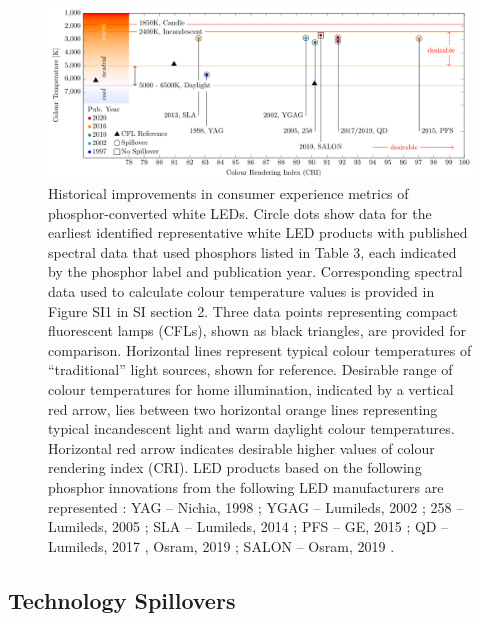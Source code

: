 \documentclass[twoside,twocolumn,9pt]{article}
\begin{document}
\begin{figure}[h]
 \centering
 \includegraphics[width=\textwidth]{2_SSL_EES/article/figures/breakthroughs_consumer-experience.pdf}
 \caption{Historical improvements in consumer experience metrics of phosphor-converted white LEDs. Circle dots show data for the earliest identified representative white LED products with published spectral data that used phosphors listed in Table 3, each indicated by the phosphor label and publication year. Corresponding spectral data used to calculate colour temperature values is provided in Figure SI1 in SI section 2. Three data points representing compact fluorescent lamps (CFLs)\cite{cie_reference}, shown as black triangles, are provided for comparison. Horizontal lines represent typical colour temperatures of “traditional” light sources, shown for reference. Desirable range of colour temperatures for home illumination, indicated by a vertical red arrow, lies between two horizontal orange lines representing typical incandescent light and warm daylight colour temperatures. Horizontal red arrow indicates desirable higher values of colour rendering index (CRI). LED products based on the following phosphor innovations from the following LED manufacturers are represented : YAG – Nichia, 1998 \cite{bando1998development}; YGAG – Lumileds, 2002 \cite{Mueller2002}; 258 – Lumileds, 2005 \cite{MuellerMach2005}; SLA – Lumileds, 2014 \cite{Pust2014}; PFS – GE, 2015 \cite{Murphy2015}; QD – Lumileds, 2017 \cite{lumileds2016qd}, Osram, 2019 \cite{osram2019qd}; SALON – Osram, 2019 \cite{Hoerder2019}.}
 \label{fgr:consumer_experience}
\end{figure}

\subsection{Technology Spillovers}
\end{document}
